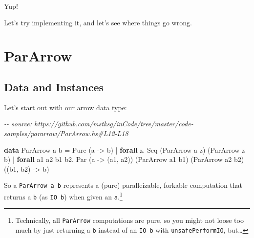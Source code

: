 \documentclass[]{article}
\newenvironment{Shaded}{}{}
\newcommand{\CommentTok}[1]{\textcolor[rgb]{0.38,0.63,0.69}{\textit{#1}}}
\newcommand{\DataTypeTok}[1]{\textcolor[rgb]{0.56,0.13,0.00}{#1}}
\newcommand{\KeywordTok}[1]{\textcolor[rgb]{0.00,0.44,0.13}{\textbf{#1}}}
\newcommand{\NormalTok}[1]{#1}
\newcommand{\OperatorTok}[1]{\textcolor[rgb]{0.40,0.40,0.40}{#1}}
\newcommand{\OtherTok}[1]{\textcolor[rgb]{0.00,0.44,0.13}{#1}}
\begin{document}
Yup!

Let's try implementing it, and let's see where things go wrong.

\section{ParArrow}\label{pararrow}

\subsection{Data and Instances}\label{data-and-instances}

Let's start out with our arrow data type:

\begin{Shaded}
\begin{Highlighting}[]
\CommentTok{{-}{-} source: https://github.com/mstksg/inCode/tree/master/code{-}samples/pararrow/ParArrow.hs\#L12{-}L18}

\KeywordTok{data} \DataTypeTok{ParArrow}\NormalTok{ a b }\OtherTok{=}                     \DataTypeTok{Pure}\NormalTok{  (a }\OtherTok{{-}\textgreater{}}\NormalTok{ b)}
                  \OperatorTok{|} \KeywordTok{forall}\NormalTok{ z}\OperatorTok{.}           \DataTypeTok{Seq}\NormalTok{   (}\DataTypeTok{ParArrow}\NormalTok{ a z)}
\NormalTok{                                              (}\DataTypeTok{ParArrow}\NormalTok{ z b)}
                  \OperatorTok{|} \KeywordTok{forall}\NormalTok{ a1 a2 b1 b2}\OperatorTok{.} \DataTypeTok{Par}\NormalTok{   (a }\OtherTok{{-}\textgreater{}}\NormalTok{ (a1, a2))}
\NormalTok{                                              (}\DataTypeTok{ParArrow}\NormalTok{ a1 b1)}
\NormalTok{                                              (}\DataTypeTok{ParArrow}\NormalTok{ a2 b2)}
\NormalTok{                                              ((b1, b2) }\OtherTok{{-}\textgreater{}}\NormalTok{ b)}
\end{Highlighting}
\end{Shaded}

So a \texttt{ParArrow\ a\ b} represents a (pure) paralleizable, forkable
computation that returns a \texttt{b} (as \texttt{IO\ b}) when given an
\texttt{a}.\footnote{Technically, all \texttt{ParArrow} computations are pure,
  so you might not loose too much by just returning a \texttt{b} instead of an
  \texttt{IO\ b} with \texttt{unsafePerformIO}, but\ldots{}}
\end{document}
